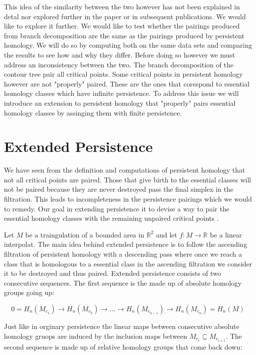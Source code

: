 This idea of the similarity between the two however has not been explained in detal nor explored further in the paper or in subsequent publications. We would like to explore it further. We would like to test whether the pairings produced from branch decomposition are the same as the pairings produced by persistent homology. We will do so by computing both on the same data sets and comparing the results to see how and why they differ. Before doing so however we must address an inconsistency between the two. The branch decomposition of the contour tree pair all critical points. Some critical points in persistent homology however are not "properly" paired. These are the ones that corespond to essential homology classes which have infinite persistence. To address this issue we will introduce an extension to persistent homology that "properly" pairs essential homology classes by assinging them with finite persistence.


\section{Extended Persistence}

We have seen from the definition and computations of persistent homology that not all critical points are paired. Those that give birth to the essential classes will not be paired because they are never destroyed pass the final simplex in the filtration. This leads to incompleteness in the persistence pairings which we would to remedy. Our goal in extending persistence it to devise a way to pair the essential homology classes with the remaining unpaired critical points \cite{persistence-extended}.


Let $M$ be a traingulation of a bounded area in $\mathbb{R}^2$ and let $f: M \to \mathbb{R}$ be a linear interpolat. The main idea behind extended persistence is to follow the ascending filtration of persistent homology with a descending pass where once we reach a class that is homologous to a essential class in the ascending filtration we consider it to be destroyed and thus paired. Extended persistence consists of two consecutive sequences. The first sequence is the made up of absolute homology groups going up:

$$ 0 = H_n(M_{c_1}) \rightarrow H_n(M_{c_2}) \rightarrow ... \rightarrow H_n(M_{c_{n-1}}) \rightarrow H_n(M_{c_n}) =  H_n(M) $$

Just like in orginary persistence the linear maps between consecutive absolute homology gruops are induced by the inclusion maps between $M_{c_i} \subseteq M_{c_{i+1}}$. The second sequence is made up of relative homology groups that come back down:


